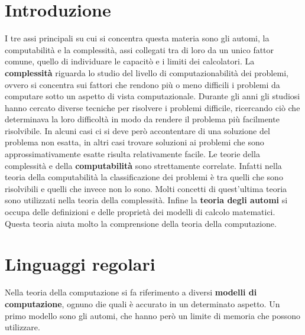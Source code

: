 \documentclass[a4paper]{extarticle}
\begin{document}
\section{Introduzione}

I tre assi principali su cui si concentra questa materia sono gli automi, la computabilità e la complessità, assi collegati tra di loro da un unico fattor comune, quello di individuare le capacitò e i limiti dei calcolatori. La \textbf{complessità} riguarda lo studio del livello di computazionabilità dei problemi, ovvero si concentra sui fattori che rendono più o meno difficili i problemi da computare sotto un aspetto di vista computazionale. Durante gli anni gli studiosi hanno cercato diverse tecniche per risolvere i problemi difficile, ricercando ciò che determinava la loro difficoltà in modo da rendere il problema più facilmente risolvibile. In alcuni casi ci si deve però accontentare di una soluzione del problema non esatta, in altri casi trovare soluzioni ai problemi che sono approssimativamente esatte risulta relativamente facile. Le teorie della complessità e della \textbf{computabilità} sono strettamente correlate. Infatti nella teoria della computabilità la classificazione dei problemi è tra quelli che sono risolvibili e quelli che invece non lo sono. Molti concetti di quest'ultima teoria sono utilizzati nella teoria della complessità. Infine la \textbf{teoria degli automi} si occupa delle definizioni e delle proprietà dei modelli di calcolo matematici. Questa teoria aiuta molto la comprensione della teoria della computazione. 

\section{Linguaggi regolari}
Nella teoria della computazione si fa riferimento a diversi \textbf{modelli di computazione}, ognuno die quali è accurato in un determinato aspetto. Un primo modello sono gli automi, che hanno però un limite di memoria che possono utilizzare.
\end{document}
